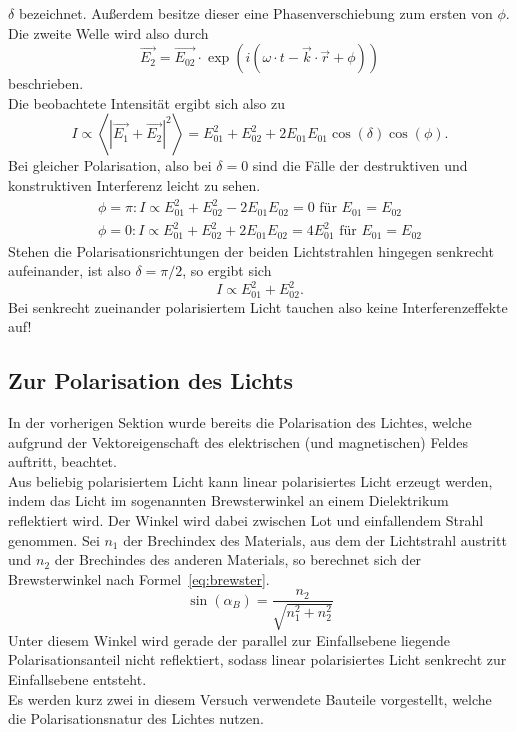 $\delta$ bezeichnet.
Außerdem besitze dieser eine Phasenverschiebung zum ersten von 
$\phi$. Die zweite Welle wird also durch
\begin{equation}
\vec{E_2} = \vec{E_{02}}\cdot \exp{(i(\omega\cdot t - 
\vec{k}\cdot \vec{r} + \phi))}
\end{equation}
beschrieben.\\
Die beobachtete Intensität ergibt sich also zu
\begin{equation}
I \propto \left<\left|\vec{E_1}+\vec{E_2}\right|^2\right>
=E_{01}^2 + E_{02}^2 + 2E_{01}E_{01}\cos{(\delta)}\cos{(\phi)}.
\label{eq:intense}
\end{equation}
Bei gleicher Polarisation, also bei $\delta =0$ sind die Fälle der 
destruktiven und konstruktiven Interferenz leicht zu sehen.
\begin{align}
\phi = \pi : I\propto E_{01}^2 + E_{02}^2 - 2E_{01}E_{02} 
 = 0 \text{ für } E_{01}=E_{02}\\
\phi = 0 : I\propto E_{01}^2 + E_{02}^2 + 2E_{01}E_{02} 
 = 4E_{01}^2 \text{ für } E_{01}=E_{02}
\end{align}
Stehen die Polarisationsrichtungen der beiden Lichtstrahlen hingegen 
senkrecht aufeinander, ist also $\delta = \pi/2$, so ergibt sich
\begin{equation}
I \propto E_{01}^2 + E_{02}^2.
\end{equation}
Bei senkrecht zueinander polarisiertem Licht tauchen also keine 
Interferenzeffekte auf!
%
\subsection{Zur Polarisation des Lichts}
%
In der vorherigen Sektion wurde bereits die Polarisation des Lichtes, 
welche aufgrund der Vektoreigenschaft des elektrischen 
(und magnetischen) Feldes auftritt, beachtet.\\
Aus beliebig polarisiertem Licht kann linear polarisiertes Licht 
erzeugt werden, indem das Licht im sogenannten Brewsterwinkel 
an einem Dielektrikum reflektiert wird. Der Winkel wird dabei 
zwischen Lot und einfallendem Strahl genommen. Sei $n_1$ 
der Brechindex des Materials, aus dem der Lichtstrahl austritt und 
$n_2$ der Brechindes des anderen Materials, so berechnet sich der 
Brewsterwinkel nach Formel~\ref{eq:brewster}.
%
\begin{equation}
\sin{(\alpha_B)} = \frac{n_2}{\sqrt{n_1^2 + n_2^2}}
\label{eq:brewster}
\end{equation}
%
Unter diesem Winkel wird gerade der parallel zur Einfallsebene 
liegende Polarisationsanteil nicht reflektiert, sodass linear 
polarisiertes Licht senkrecht zur Einfallsebene entsteht.\\
Es werden kurz zwei in diesem Versuch verwendete Bauteile 
vorgestellt, welche die Polarisationsnatur des Lichtes nutzen.
%
